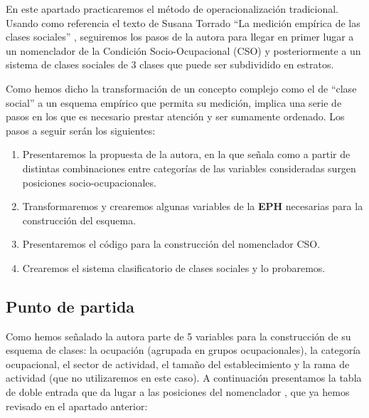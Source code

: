 \documentclass[
]{book}
\begin{document}
En este apartado practicaremos el método de operacionalización tradicional. Usando como referencia el texto de Susana Torrado ``La medición empírica de las clases sociales'' \citep{Torrado1998d}, seguiremos los pasos de la autora para llegar en primer lugar a un nomenclador de la Condición Socio-Ocupacional (CSO) y posteriormente a un sistema de clases sociales de 3 clases que puede ser subdividido en estratos.

Como hemos dicho la transformación de un concepto complejo como el de ``clase social'' a un esquema empírico que permita su medición, implica una serie de pasos en los que es necesario prestar atención y ser sumamente ordenado. Los pasos a seguir serán los siguientes:

\begin{enumerate}
\def\labelenumi{\arabic{enumi}.}
\item
  Presentaremos la propuesta de la autora, en la que señala como a partir de distintas combinaciones entre categorías de las variables consideradas surgen posiciones socio-ocupacionales.
\item
  Transformaremos y crearemos algunas variables de la \textbf{EPH} necesarias para la construcción del esquema.
\item
  Presentaremos el código para la construcción del nomenclador CSO.
\item
  Crearemos el sistema clasificatorio de clases sociales y lo probaremos.
\end{enumerate}

\hypertarget{punto-de-partida}{%
\subsection{Punto de partida}\label{punto-de-partida}}

Como hemos señalado la autora parte de 5 variables para la construcción de su esquema de clases: la ocupación (agrupada en grupos ocupacionales), la categoría ocupacional, el sector de actividad, el tamaño del establecimiento y la rama de actividad (que no utilizaremos en este caso). A continuación presentamos la tabla de doble entrada que da lugar a las posiciones del nomenclador \citep[pp.~232]{Torrado1998d}, que ya hemos revisado en el apartado anterior:
\end{document}
